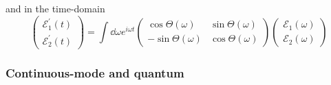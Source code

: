 and in the time-domain
\begin{equation}
    \begin{pmatrix}
        \mathcal{E}_1^\prime(t)
        \\
        \mathcal{E}_2^\prime(t)
    \end{pmatrix}
    =
    \int\dd{\omega}e^{i\omega t}
    \begin{pmatrix}
        \cos\Theta(\omega) & \sin\Theta(\omega)
        \\
        -\sin\Theta(\omega) & \cos\Theta(\omega)
    \end{pmatrix}
    \begin{pmatrix}
        \mathcal{E}_1(\omega)
        \\
        \mathcal{E}_2(\omega)
    \end{pmatrix}
\end{equation}

\subsubsection{Continuous-mode and quantum}
